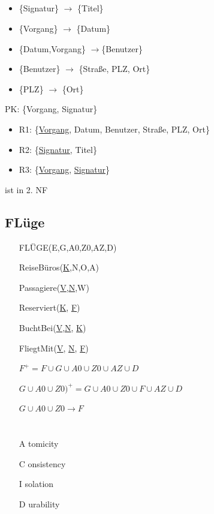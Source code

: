 \subsection{}
\begin{itemize}
	\item \{Signatur\} $\to$ \{Titel\}
	\item \{Vorgang\} $\to$ \{Datum\}
	\item \{Datum,Vorgang\} $\to$\{Benutzer\}
	\item \{Benutzer\} $\to$ \{Straße, PLZ, Ort\}
	\item \{PLZ\} $\to$ \{Ort\}
\end{itemize}
PK: \{Vorgang, Signatur\}
\begin{itemize}
	\item R1: \{\underline{Vorgang}, Datum, Benutzer, Straße, PLZ, Ort\}
	\item R2: \{\underline{Signatur}, Titel\}
	\item R3: \{\underline{Vorgang}, \underline{Signatur}\}
\end{itemize}
ist in 2. NF
\subsection{FLüge}
\begin{itemize}
	\item[] FLÜGE(E,G,A0,Z0,AZ,D)
	\item[] ReiseBüros(\underline{K},N,O,A)
	\item[] Passagiere(\underline{V},\underline{N},W)
	\item[] Reserviert(\underline{K}, \underline{F})
	\item[] BuchtBei(\underline{V},\underline{N}, \underline{K})
	\item[] FliegtMit(\underline{V}, \underline{N}, \underline{F})
	\item[] $ F^+ = F \cup G \cup A0 \cup Z0 \cup AZ \cup D$
	\item[] $ G\cup A0 \cup Z0)^+ = G \cup A0 \cup Z0\cup F \cup AZ \cup D $
	\item[] $ G\cup A0 \cup Z0 \to F$
\end{itemize}
\section{}
\subsection{}
\begin{itemize}
	\item[A]tomicity
	\item[C]onsistency
	\item[I]solation
	\item[D]urability
\end{itemize}
